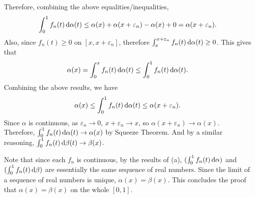 \documentclass[12pt]{article}
\begin{document}
\begin{fproof}[3(b)]
Therefore, combining the above equalities/inequalities,
\begin{align*}
    \int_{0}^{1} f_n(t) \mathop{}\!\mathrm{d}\alpha(t) \leq \alpha(x) + \alpha(x + \varepsilon_n) - \alpha(x) + 0 = \alpha(x+\varepsilon_n).
\end{align*}
Also, since \(f_n(t) \geq 0\) on \([x, x+ \varepsilon_n]\), therefore \(\int_{x}^{x+\varepsilon_n} f_n(t) \mathop{}\!\mathrm{d}\alpha(t) \geq 0\).
This gives that
\begin{align*}
    \alpha(x) = \int_{0}^{x} f_n(t) \mathop{}\!\mathrm{d}\alpha(t) \leq \int_{0}^{1} f_n(t) \mathop{}\!\mathrm{d}\alpha(t).
\end{align*}
Combining the above results, we have
\begin{align*}
    \alpha(x) \leq \int_{0}^{1} f_n(t) \mathop{}\!\mathrm{d}\alpha(t) \leq \alpha(x + \varepsilon_n).
\end{align*}
Since \(\alpha\) is continuous, as \(\varepsilon_n \to 0\), \(x + \varepsilon_n \to x\), so \(\alpha(x + \varepsilon_n) \to \alpha(x)\).
Therefore, \(\int_{0}^{1} f_n(t) \mathop{}\!\mathrm{d}\alpha(t) \to \alpha(x)\) by Squeeze Theorem.
And by a similar reasoning, \(\int_{0}^{1} f_n(t) \mathop{}\!\mathrm{d}\beta(t) \to \beta(x)\).

Note that since each \(f_n\) is continuous, by the results of (a), \((\int_{0}^{1} f_n(t) \mathop{}\!\mathrm{d}\alpha)\) and \((\int_{0}^{1} f_n(t) \mathop{}\!\mathrm{d}\beta)\) are essentially the same sequence of real numbers.
Since the limit of a sequence of real numbers is unique, \(\alpha(x) = \beta(x)\).
This concludes the proof that \(\alpha(x) = \beta(x)\) on the whole \([0,1]\).
\end{fproof}
\newpage
\end{document}

